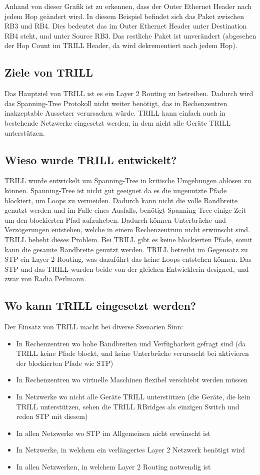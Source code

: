 \documentclass[a4,12pt]{scrartcl}
\begin{document}
\noindent Anhand von dieser Grafik ist zu erkennen, dass der Outer Ethernet Header nach jedem Hop geändert wird. In diesem Beispiel befindet sich das Paket zwischen RB3 und RB4. Dies bedeutet das im Outer Ethernet Header unter Destination RB4 steht, und unter Source RB3. Das restliche Paket ist unverändert (abgesehen der Hop Count im TRILL Header, da wird dekrementiert nach jedem Hop). 
\newpage

\subsection{Ziele von TRILL}
Das Hauptziel von TRILL ist es ein Layer 2 Routing zu betreiben. Dadurch wird das Spanning-Tree Protokoll nicht weiter benötigt, das in Rechenzentren inakzeptable Aussetzer verursachen würde. TRILL kann einfach auch in bestehende Netzwerke eingesetzt werden, in dem nicht alle Geräte TRILL unterstützen. 

\subsection{Wieso wurde TRILL entwickelt?}
TRILL wurde entwickelt um Spanning-Tree in kritische Umgebungen ablösen zu können. Spanning-Tree ist nicht gut geeignet da es die ungenutzte Pfade blockiert, um Loops zu vermeiden. Dadurch kann nicht die volle Bandbreite genutzt werden und im Falle eines Ausfalls, benötigt Spanning-Tree einige Zeit um den blockierten Pfad aufzuheben. Dadurch können Unterbrüche und Verzögerungen entstehen, welche in einem Rechenzentrum nicht erwünscht sind. TRILL behebt dieses Problem. Bei TRILL gibt es keine blockierten Pfade, somit kann die gesamte Bandbreite genutzt werden. TRILL betreibt im Gegensatz zu STP ein Layer 2 Routing, was dazuführt das keine Loops entstehen können. Das STP und das TRILL wurden beide von der gleichen Entwicklerin designed, und zwar von Radia Perlmann. 

\subsection{Wo kann TRILL eingesetzt werden?}
Der Einsatz von TRILL macht bei diverse Szenarien Sinn: 
\begin{itemize}
\item In Rechenzentren wo hohe Bandbreiten und Verfügbarkeit gefragt sind (da TRILL keine Pfade blockt, und keine Unterbrüche verursacht bei aktivieren der blockierten Pfade wie STP) 
\item In Rechenzentren wo virtuelle Maschinen flexibel verschiebt werden müssen
\item In Netzwerke wo nicht alle Geräte TRILL unterstützen (die Geräte, die kein TRILL unterstützen, sehen die TRILL RBridges als einzigen Switch und reden STP mit diesem)
\item In allen Netzwerke wo STP im Allgemeinen nicht erwünscht ist 
\item In Netzwerke, in welchem ein verlängertes Layer 2 Netzwerk benötigt wird 
\item In allen Netzwerken, in welchem Layer 2 Routing notwendig ist 
\end{itemize}
\end{document}
